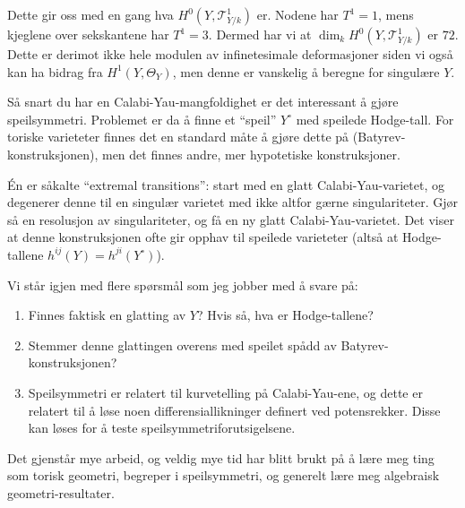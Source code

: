 \documentclass[11pt, norsk]{article}
\begin{document}
Dette gir oss med en gang hva $H^0(Y,\mathcal T^1_{Y/k})$ er. Nodene har $T^1=1$, mens kjeglene over sekskantene har $T^1=3$. Dermed har vi at $\dim_k H^0(Y,\mathcal T^1_{Y/k})$ er $72$. Dette er derimot ikke hele modulen av infinetesimale deformasjoner siden vi også kan ha bidrag fra $H^1(Y,\Theta_Y)$, men denne er vanskelig å beregne for singulære $Y$.

Så snart du har en Calabi-Yau-mangfoldighet er det interessant å gjøre speilsymmetri. Problemet er da å finne et ``speil'' $Y^\circ$ med speilede Hodge-tall. For toriske varieteter finnes det en standard måte å gjøre dette på (Batyrev-konstruksjonen), men det finnes andre, mer hypotetiske konstruksjoner.

Én er såkalte ``extremal transitions'': start med en glatt Calabi-Yau-varietet, og degenerer denne til en singulær varietet med ikke altfor gærne singulariteter. Gjør så en resolusjon av singulariteter, og få en ny glatt Calabi-Yau-varietet. Det viser at denne konstruksjonen ofte gir opphav til speilede varieteter (altså at Hodge-tallene $h^{ij}(Y)=h^{ji}(Y^\circ)$). 

Vi står igjen med flere spørsmål som jeg jobber med å svare på:
\begin{enumerate}
\item Finnes faktisk en glatting av $Y$? Hvis så, hva er Hodge-tallene?
\item Stemmer denne glattingen overens med speilet spådd av Batyrev-konstruksjonen? 
\item Speilsymmetri er relatert til kurvetelling på Calabi-Yau-ene, og dette er relatert til å løse noen differensiallikninger definert ved potensrekker. Disse kan løses for å teste speilsymmetriforutsigelsene. 
\end{enumerate}

Det gjenstår mye arbeid, og veldig mye tid har blitt brukt på å lære meg ting som torisk geometri, begreper i speilsymmetri, og generelt lære meg algebraisk geometri-resultater.



\end{document}
